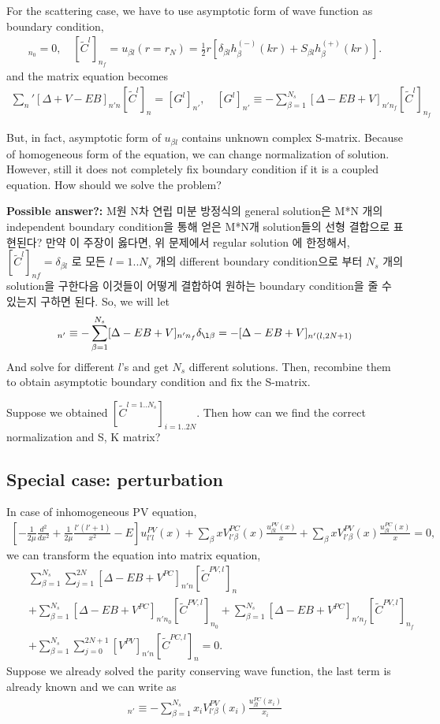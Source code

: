 \documentclass[10pt]{book}
\newcommand{\bea}{\begin{eqnarray}}
\newcommand{\eea}{\end{eqnarray}}
\newcommand{\no}{\nonumber \\}
\begin{document}
For the scattering case, we have to use asymptotic form of wave function as boundary 
condition,
\bea 
[\tilde{C}^l]_{n_0}=0,\quad 
[\tilde{C}^l]_{n_f}= u_{\beta l}(r=r_N)
                   =\frac{1}{2}r[\delta_{\beta l} h_{\beta}^{(-)}(kr)
                                 +S_{\beta l} h_{\beta}^{(+)}(kr)]   
.
\eea 
and the matrix equation becomes
\bea 
{\sum_{n}}'[\Delta+V-E B]_{n'n}[\tilde{C}^l]_{n}
=[ G^l ]_{n'},
\quad [G^l]_{n'}\equiv -\sum_{\beta=1}^{N_{s}}[\Delta -E B +V]_{n'n_f}[\tilde{C}^l]_{n_f}
\eea 

But, in fact, asymptotic form of $u_{\beta l}$ contains unknown 
complex S-matrix. Because of homogeneous form of the equation, 
we can change normalization of solution. 
However, still it does not completely fix boundary condition if it is a coupled equation.
How should we solve the problem? 

{\bf Possible answer?:} M원 N차 연립 미분 방정식의 general solution은 
M*N 개의 independent boundary condition을 통해 얻은 M*N개 
solution들의 선형 결합으로 표현된다? 만약 이 주장이 옳다면, 위 문제에서 
regular solution 에 한정해서, $[\tilde{C}^l]_{nf}=\delta_{\beta l}$ 
로 모든 $l=1..N_s$ 개의 different boundary condition으로 부터  
$N_s$ 개의 solution을 구한다음 이것들이 어떻게 결합하여 원하는 boundary condition을 줄 수 있는지
구하면 된다. So, we will let 
\bea 
[G^l]_{n'}\equiv -\sum_{\beta=1}^{N_{s}}[\Delta -E B +V]_{n'n_f} \delta_{\l \beta}
             = -[\Delta -E B +V]_{n'(l,2N+1)}
\eea 
And solve for different $l$'s and get $N_s$ different solutions. Then, 
recombine them to obtain asymptotic boundary condition and fix the S-matrix. 

Suppose we obtained $[\tilde{C}^{l=1..N_s}]_{i=1..2N}$. Then how can we find the
correct normalization and S, K matrix?


\subsection{Special case: perturbation}
In case of inhomogeneous PV equation, 
\bea 
\left[ -\frac{1}{2\mu}\frac{d^2}{dx^2}+\frac{1}{2\mu}\frac{l'(l'+1)}{x^2}-E\right] 
u^{PV}_{l' l}(x)+\sum_{\beta} x V^{PC}_{l'\beta}(x) \frac{u^{PV}_{\beta l}(x)}{x}
+\sum_{\beta} x V^{PV}_{l'\beta}(x) \frac{u^{PC}_{\beta l}(x)}{x}
 =0,
\eea
we can transform the equation into matrix equation,
\bea 
& &\sum_{\beta=1}^{N_{s}}\sum_{j=1}^{2N}[\Delta -E B +V^{PC}]_{n'n}[\tilde{C}^{PV,l}]_n \no 
& &+\sum_{\beta=1}^{N_{s}}[\Delta -E B +V^{PC}]_{n'n_0}[\tilde{C}^{PV,l}]_{n_0}
+\sum_{\beta=1}^{N_{s}}[\Delta -E B +V^{PC}]_{n'n_f}[\tilde{C}^{PV,l}]_{n_f} \no 
& &+\sum_{\beta=1}^{N_s}\sum_{j=0}^{2N+1}[V^{PV}]_{n'n}[\tilde{C}^{PC,l}]_{n} 
=0.
\eea  
Suppose we already solved the parity conserving wave function, 
the last term is already known and we can write as
\bea 
[K^l]_{n'} \equiv -\sum_{\beta=1}^{N_s} x_i V^{PV}_{l'\beta}(x_i) \frac{u^{PC}_{\beta l}(x_i)}{x_i}
\eea 
\end{document}
